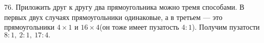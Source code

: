76. Приложить друг к другу два прямоугольника можно тремя способами. В первых двух случаях прямоугольники одинаковые, а в третьем --- это прямоугольники $4\times1$ и $16\times4$(он тоже имеет пузатость $4:1$). Получим пузатости $8:1,\ 2:1,\ 17:4.$
\begin{center}
\begin{figure}[ht!]
\end{figure}
\end{center}
